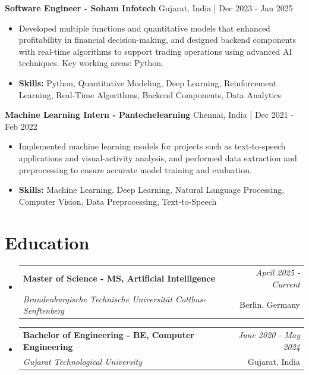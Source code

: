 \documentclass[a4paper,11pt]{article}
\makeatletter
\newcommand{\resumeSubheading}[4]{
\vspace{0.5mm}\item
    \begin{tabular*}{\linewidth}[t]{l@{\extracolsep{\fill}}r}
        \textbf{#1} & \textit{\footnotesize{#4}} \\
        \textit{\footnotesize{#3}} &  \footnotesize{#2}\\
    \end{tabular*}
    \vspace{-2.4mm}
}
\makeatother
\begin{document}
\vspace{1mm}
  \textbf{Software Engineer - Soham Infotech} \hfill Gujarat, India | Dec 2023 - Jan 2025
\vspace{-1.5mm} %
\begin{itemize}
  \item Developed multiple functions and quantitative models that enhanced profitability in financial decision-making, and designed backend components with real-time algorithms to support trading operations using advanced AI techniques. Key working areas: Python.

\vspace{-2mm}
  \item \textbf{Skills:} Python, Quantitative Modeling, Deep Learning, Reinforcement Learning, Real-Time Algorithms, Backend Components, Data Analytics
\end{itemize}

\vspace{1mm}
  \textbf{Machine Learning Intern - Pantechelearning} \hfill Chennai, India | Dec 2021 - Feb 2022
\vspace{-1.5mm} %
\begin{itemize}
  \item Implemented machine learning models for projects such as text-to-speech applications and visual-activity analysis, and performed data extraction and preprocessing to ensure accurate model training and evaluation.
\vspace{-2mm}
  \item \textbf{Skills:} Machine Learning, Deep Learning, Natural Language Processing, Computer Vision, Data Preprocessing, Text-to-Speech
\end{itemize}\section{\textbf{Education}}
\vspace{-0.4mm}

\begin{itemize}[leftmargin=0.15in, label={}]
\resumeSubheading
{Master of Science - MS, Artificial Intelligence }{Berlin, Germany}
{Brandenburgische Technische Universität Cottbus-Senftenberg  }{April 2025 - Current}

\vspace{1.0mm} %
\resumeSubheading
{Bachelor of Engineering - BE, Computer Engineering  }{Gujarat, India}
{Gujarat Technological University }{June 2020 - May 2024}

\end{itemize}
\end{document}
